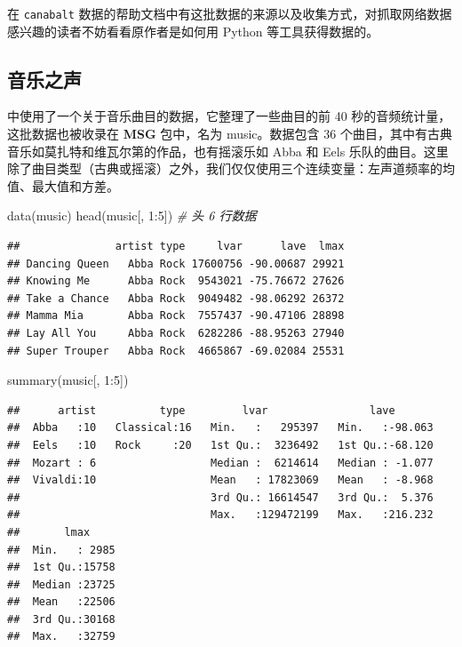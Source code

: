 \documentclass[
  b5paper,
  UTF8,twoside]{book}
\newenvironment{Shaded}{\begin{snugshade}}{\end{snugshade}}
\newcommand{\CommentTok}[1]{\textcolor[rgb]{0.56,0.35,0.01}{\textit{#1}}}
\newcommand{\DecValTok}[1]{\textcolor[rgb]{0.00,0.00,0.81}{#1}}
\newcommand{\FunctionTok}[1]{\textcolor[rgb]{0.00,0.00,0.00}{#1}}
\newcommand{\NormalTok}[1]{#1}
\newcommand{\SpecialCharTok}[1]{\textcolor[rgb]{0.00,0.00,0.00}{#1}}
\begin{document}
在 \texttt{canabalt} 数据的帮助文档中有这批数据的来源以及收集方式，对抓取网络数据感兴趣的读者不妨看看原作者是如何用 Python 等工具获得数据的。

\hypertarget{subsec:music}{%
\subsection{音乐之声}\label{subsec:music}}

\citet{Cook07} 中使用了一个关于音乐曲目的数据，它整理了一些曲目的前 40 秒的音频统计量，这批数据也被收录在 \textbf{MSG} 包中，名为 music。数据包含 36 个曲目，其中有古典音乐如莫扎特和维瓦尔第的作品，也有摇滚乐如 Abba 和 Eels 乐队的曲目。这里除了曲目类型（古典或摇滚）之外，我们仅仅使用三个连续变量：左声道频率的均值、最大值和方差。

\begin{Shaded}
\begin{Highlighting}[]
\FunctionTok{data}\NormalTok{(music)}
\FunctionTok{head}\NormalTok{(music[, }\DecValTok{1}\SpecialCharTok{:}\DecValTok{5}\NormalTok{]) }\CommentTok{\# 头 6 行数据}
\end{Highlighting}
\end{Shaded}

\begin{verbatim}
##               artist type     lvar      lave  lmax
## Dancing Queen   Abba Rock 17600756 -90.00687 29921
## Knowing Me      Abba Rock  9543021 -75.76672 27626
## Take a Chance   Abba Rock  9049482 -98.06292 26372
## Mamma Mia       Abba Rock  7557437 -90.47106 28898
## Lay All You     Abba Rock  6282286 -88.95263 27940
## Super Trouper   Abba Rock  4665867 -69.02084 25531
\end{verbatim}

\begin{Shaded}
\begin{Highlighting}[]
\FunctionTok{summary}\NormalTok{(music[, }\DecValTok{1}\SpecialCharTok{:}\DecValTok{5}\NormalTok{])}
\end{Highlighting}
\end{Shaded}

\begin{verbatim}
##      artist          type         lvar                lave        
##  Abba   :10   Classical:16   Min.   :   295397   Min.   :-98.063  
##  Eels   :10   Rock     :20   1st Qu.:  3236492   1st Qu.:-68.120  
##  Mozart : 6                  Median :  6214614   Median : -1.077  
##  Vivaldi:10                  Mean   : 17823069   Mean   : -8.968  
##                              3rd Qu.: 16614547   3rd Qu.:  5.376  
##                              Max.   :129472199   Max.   :216.232  
##       lmax      
##  Min.   : 2985  
##  1st Qu.:15758  
##  Median :23725  
##  Mean   :22506  
##  3rd Qu.:30168  
##  Max.   :32759
\end{verbatim}
\end{document}
